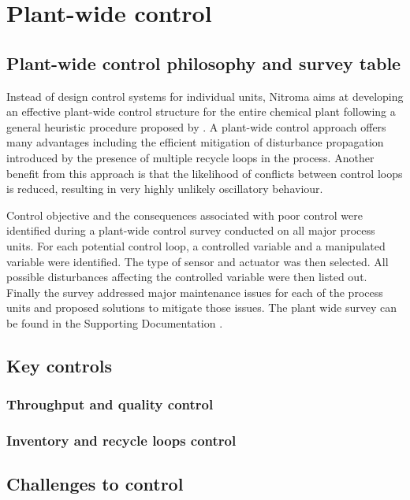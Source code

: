 \section{Plant-wide control}

\subsection{Plant-wide control philosophy and survey table}%

Instead of design control systems for individual units, Nitroma aims at developing an effective plant-wide control structure for the entire chemical plant following a general heuristic procedure proposed by \textcite{}. A plant-wide control approach offers many advantages including the efficient mitigation of disturbance propagation introduced by the presence of multiple recycle loops in the process. Another benefit from this approach is that the likelihood of conflicts between control loops is reduced, resulting in very highly unlikely  oscillatory behaviour. 

Control objective and the consequences associated with poor control were identified during a plant-wide control survey conducted on all major process units. For each potential control loop, a controlled variable and a manipulated variable were identified. The type of sensor and actuator was then selected. All possible disturbances affecting the controlled variable were then listed out. Finally the survey addressed major maintenance issues for each of the process units and proposed solutions to mitigate those issues. The plant wide survey can be found in the Supporting Documentation .


\subsection{Key controls}%

\subsubsection{Throughput and quality control}


\subsubsection{Inventory and recycle loops control}




\subsection{Challenges to control}%

